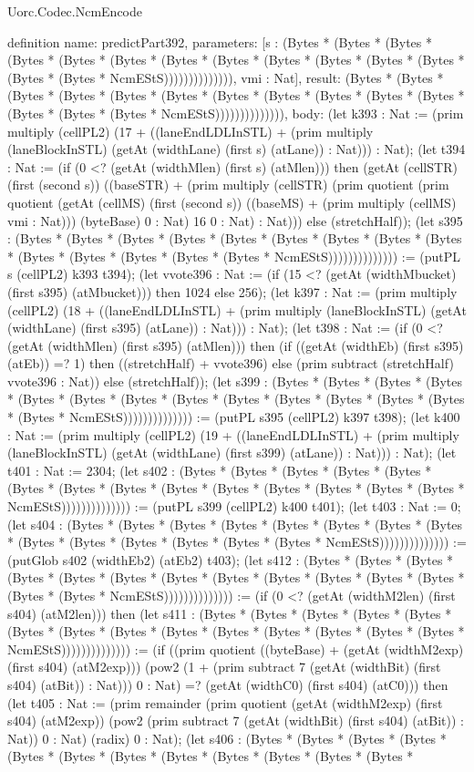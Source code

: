 \begin{lexlean}{Uorc.Codec.NcmEncode}
\begin{semanticmodule}
definition{
  name: predictPart392,
  parameters: [s : (Bytes * (Bytes * (Bytes * (Bytes * (Bytes * (Bytes * (Bytes * (Bytes * (Bytes * (Bytes * (Bytes * (Bytes * (Bytes * (Bytes * NcmEStS)))))))))))))), vmi : Nat],
  result: (Bytes * (Bytes * (Bytes * (Bytes * (Bytes * (Bytes * (Bytes * (Bytes * (Bytes * (Bytes * (Bytes * (Bytes * (Bytes * (Bytes * NcmEStS)))))))))))))),
  body: (let k393 : Nat := (prim multiply (cellPL2) (17 + ((laneEndLDLInSTL) + (prim multiply (laneBlockInSTL) (getAt (widthLane) (first s) (atLane)) : Nat))) : Nat); (let t394 : Nat := (if (0 <? (getAt (widthMlen) (first s) (atMlen))) then (getAt (cellSTR) (first (second s)) ((baseSTR) + (prim multiply (cellSTR) (prim quotient (prim quotient (getAt (cellMS) (first (second s)) ((baseMS) + (prim multiply (cellMS) vmi : Nat))) (byteBase) 0 : Nat) 16 0 : Nat) : Nat))) else (stretchHalf)); (let s395 : (Bytes * (Bytes * (Bytes * (Bytes * (Bytes * (Bytes * (Bytes * (Bytes * (Bytes * (Bytes * (Bytes * (Bytes * (Bytes * (Bytes * NcmEStS)))))))))))))) := (putPL s (cellPL2) k393 t394); (let vvote396 : Nat := (if (15 <? (getAt (widthMbucket) (first s395) (atMbucket))) then 1024 else 256); (let k397 : Nat := (prim multiply (cellPL2) (18 + ((laneEndLDLInSTL) + (prim multiply (laneBlockInSTL) (getAt (widthLane) (first s395) (atLane)) : Nat))) : Nat); (let t398 : Nat := (if (0 <? (getAt (widthMlen) (first s395) (atMlen))) then (if ((getAt (widthEb) (first s395) (atEb)) =? 1) then ((stretchHalf) + vvote396) else (prim subtract (stretchHalf) vvote396 : Nat)) else (stretchHalf)); (let s399 : (Bytes * (Bytes * (Bytes * (Bytes * (Bytes * (Bytes * (Bytes * (Bytes * (Bytes * (Bytes * (Bytes * (Bytes * (Bytes * (Bytes * NcmEStS)))))))))))))) := (putPL s395 (cellPL2) k397 t398); (let k400 : Nat := (prim multiply (cellPL2) (19 + ((laneEndLDLInSTL) + (prim multiply (laneBlockInSTL) (getAt (widthLane) (first s399) (atLane)) : Nat))) : Nat); (let t401 : Nat := 2304; (let s402 : (Bytes * (Bytes * (Bytes * (Bytes * (Bytes * (Bytes * (Bytes * (Bytes * (Bytes * (Bytes * (Bytes * (Bytes * (Bytes * (Bytes * NcmEStS)))))))))))))) := (putPL s399 (cellPL2) k400 t401); (let t403 : Nat := 0; (let s404 : (Bytes * (Bytes * (Bytes * (Bytes * (Bytes * (Bytes * (Bytes * (Bytes * (Bytes * (Bytes * (Bytes * (Bytes * (Bytes * (Bytes * NcmEStS)))))))))))))) := (putGlob s402 (widthEb2) (atEb2) t403); (let s412 : (Bytes * (Bytes * (Bytes * (Bytes * (Bytes * (Bytes * (Bytes * (Bytes * (Bytes * (Bytes * (Bytes * (Bytes * (Bytes * (Bytes * NcmEStS)))))))))))))) := (if (0 <? (getAt (widthM2len) (first s404) (atM2len))) then (let s411 : (Bytes * (Bytes * (Bytes * (Bytes * (Bytes * (Bytes * (Bytes * (Bytes * (Bytes * (Bytes * (Bytes * (Bytes * (Bytes * (Bytes * NcmEStS)))))))))))))) := (if ((prim quotient ((byteBase) + (getAt (widthM2exp) (first s404) (atM2exp))) (pow2 (1 + (prim subtract 7 (getAt (widthBit) (first s404) (atBit)) : Nat))) 0 : Nat) =? (getAt (widthC0) (first s404) (atC0))) then (let t405 : Nat := (prim remainder (prim quotient (getAt (widthM2exp) (first s404) (atM2exp)) (pow2 (prim subtract 7 (getAt (widthBit) (first s404) (atBit)) : Nat)) 0 : Nat) (radix) 0 : Nat); (let s406 : (Bytes * (Bytes * (Bytes * (Bytes * (Bytes * (Bytes * (Bytes * (Bytes * (Bytes * (Bytes * (Bytes * (Bytes * }
\end{semanticmodule}
\end{lexlean}
